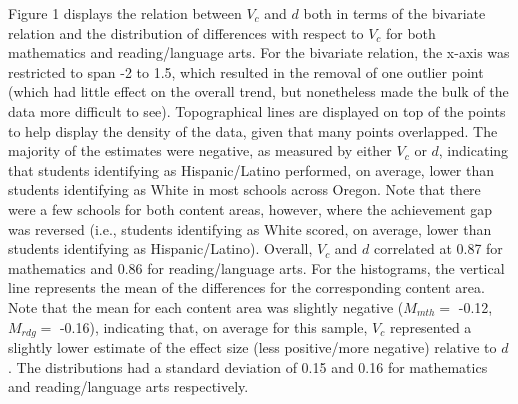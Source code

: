 \documentclass[man, fleqn, noextraspace]{apa6}
\theoremstyle{definition}
\theoremstyle{definition}
\theoremstyle{definition}
\theoremstyle{remark}
\begin{document}
Figure 1 displays the relation between \(V_c\) and \(d\) both in terms
of the bivariate relation and the distribution of differences with
respect to \(V_c\) for both mathematics and reading/language arts. For
the bivariate relation, the x-axis was restricted to span -2 to 1.5,
which resulted in the removal of one outlier point (which had little
effect on the overall trend, but nonetheless made the bulk of the data
more difficult to see). Topographical lines are displayed on top of the
points to help display the density of the data, given that many points
overlapped. The majority of the estimates were negative, as measured by
either \(V_c\) or \(d\), indicating that students identifying as
Hispanic/Latino performed, on average, lower than students identifying
as White in most schools across Oregon. Note that there were a few
schools for both content areas, however, where the achievement gap was
reversed (i.e., students identifying as White scored, on average, lower
than students identifying as Hispanic/Latino). Overall, \(V_c\) and
\(d\) correlated at 0.87 for mathematics and 0.86 for reading/language
arts. For the histograms, the vertical line represents the mean of the
differences for the corresponding content area. Note that the mean for
each content area was slightly negative (\(M_{mth} =\) -0.12,
\(M_{rdg} =\) -0.16), indicating that, on average for this sample,
\(V_c\) represented a slightly lower estimate of the effect size (less
positive/more negative) relative to \(d\). The distributions had a
standard deviation of 0.15 and 0.16 for mathematics and reading/language
arts respectively.
\end{document}

